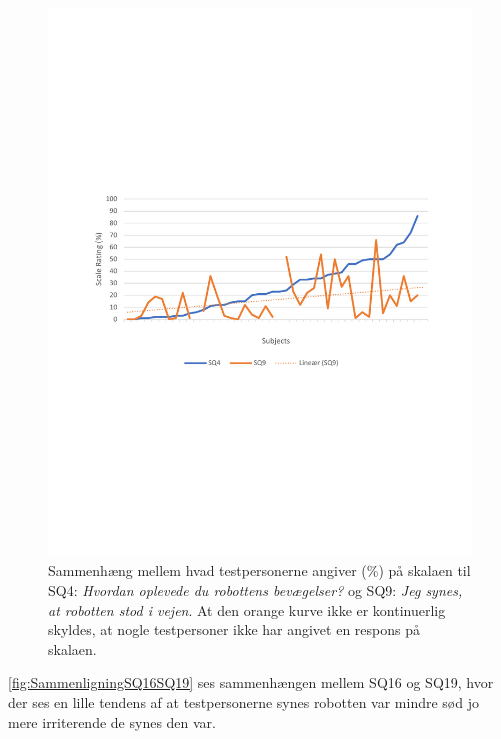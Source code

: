 \begin{figure}[H]
	\centering
	\includegraphics[width=\textwidth]{Figure/Korrelationsgrafer/SQ4+SQ9}
	\caption{Sammenhæng mellem hvad testpersonerne angiver (\%) på skalaen til SQ4: \textit{Hvordan oplevede du robottens bevægelser?} og SQ9: \textit{Jeg synes, at robotten stod i vejen}. At den orange kurve ikke er kontinuerlig skyldes, at nogle testpersoner ikke har angivet en respons på skalaen.}
	\label{fig:SammenligningSQ4SQ9}
\end{figure}
\noindent
%
\autoref{fig:SammenligningSQ16SQ19} ses sammenhængen mellem SQ16 og SQ19, hvor der ses en lille tendens af at testpersonerne synes robotten var mindre sød jo mere irriterende de synes den var. 
%
